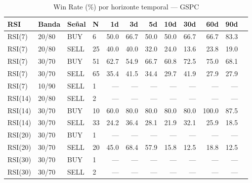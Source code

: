 %
\begin{table}[htbp]
    \centering
    \caption{Win Rate (\%) por horizonte temporal --- GSPC}
    \label{tab:winrate_gspc}
    \small
    \begin{tabular}{llllrrrrrrrr}
        \toprule
        \textbf{RSI} & \textbf{Banda} & \textbf{Se\~{n}al} & \textbf{N} & \textbf{1d} & \textbf{3d} & \textbf{5d} & \textbf{10d} & \textbf{30d} & \textbf{60d} & \textbf{90d} \\
        \midrule
        RSI(7) & 20/80 & BUY & 6 & 50.0 & 66.7 & 50.0 & 50.0 & 66.7 & 66.7 & 83.3 \\
        RSI(7) & 20/80 & SELL & 25 & 40.0 & 40.0 & 32.0 & 24.0 & 13.6 & 23.8 & 19.0 \\
        RSI(7) & 30/70 & BUY & 51 & 62.7 & 54.9 & 66.7 & 60.8 & 72.5 & 75.0 & 68.1 \\
        RSI(7) & 30/70 & SELL & 65 & 35.4 & 41.5 & 34.4 & 29.7 & 41.9 & 27.9 & 27.9 \\
        RSI(7) & 10/90 & SELL & 1 & --- & --- & --- & --- & --- & --- & --- \\
        \midrule
        RSI(14) & 20/80 & SELL & 2 & --- & --- & --- & --- & --- & --- & --- \\
        RSI(14) & 30/70 & BUY & 10 & 60.0 & 80.0 & 80.0 & 80.0 & 80.0 & 100.0 & 87.5 \\
        RSI(14) & 30/70 & SELL & 33 & 24.2 & 36.4 & 28.1 & 21.9 & 32.1 & 25.9 & 18.5 \\
        \midrule
        RSI(20) & 30/70 & BUY & 1 & --- & --- & --- & --- & --- & --- & --- \\
        RSI(20) & 30/70 & SELL & 20 & 45.0 & 68.4 & 57.9 & 15.8 & 12.5 & 18.8 & 12.5 \\
        \midrule
        RSI(30) & 30/70 & BUY & 1 & --- & --- & --- & --- & --- & --- & --- \\
        RSI(30) & 30/70 & SELL & 2 & --- & --- & --- & --- & --- & --- & --- \\
        \bottomrule
    \end{tabular}
\end{table}
